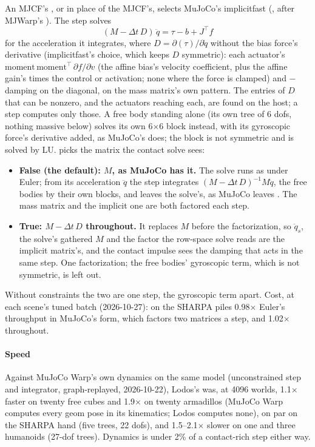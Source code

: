 An MJCF's , or  in place of the MJCF's, selects MuJoCo's implicitfast (, after MJWarp's ). The step solves
\begin{equation}\label{eq:implicitfast}
(M - \Delta t\,D)\,\ddot q = \tau - b + J^\top f
\end{equation}
for the acceleration it integrates, where $D = \partial(\tau)/\partial \dot q$ without the bias force's derivative (implicitfast's choice, which keeps $D$ symmetric): each actuator's $\mathrm{moment}\,\mathrm{moment}^\top\, \partial f/\partial v$ (the affine bias's velocity coefficient, plus the affine gain's times the control or activation; none where the force is clamped) and $-$damping on the diagonal, on the mass matrix's own pattern. The entries of $D$ that can be nonzero, and the actuators reaching each, are found on the host; a step computes only those. A free body standing alone (its own tree of 6 dofs, nothing massive below) solves its own 6$\times$6 block instead, with its gyroscopic force's derivative added, as MuJoCo's  does; the block is not symmetric and is solved by LU.  picks the matrix the contact solve sees:
\begin{itemize}
\item \textbf{False (the default): $M$, as MuJoCo has it.} The solve runs as under Euler; from its acceleration $\ddot q$ the step integrates $(M - \Delta t\,D)^{-1} M \ddot q$, the free bodies by their own blocks, and leaves  the solve's, as MuJoCo leaves . The mass matrix and the implicit one are both factored each step.
\item \textbf{True: $M - \Delta t\,D$ throughout.} It replaces $M$ before the factorization, so $\ddot q_s$, the solve's gathered $M$ and the factor the row-space solve reads are the implicit matrix's, and the contact impulse sees the damping that acts in the same step. One factorization; the free bodies' gyroscopic term, which is not symmetric, is left out.
\end{itemize}
Without constraints the two are one step, the gyroscopic term apart. Cost, at each scene's tuned batch (2026-10-27): on the SHARPA piles 0.98$\times$ Euler's throughput in MuJoCo's form, which factors two matrices a step, and 1.02$\times$ throughout.

\paragraph{Speed} Against MuJoCo Warp's own dynamics on the same model (unconstrained step and integrator, graph-replayed, 2026-10-22), Lodos's was, at 4096 worlds, 1.1$\times$ faster on twenty free cubes and 1.9$\times$ on twenty armadillos (MuJoCo Warp computes every geom pose in its kinematics; Lodos computes none), on par on the SHARPA hand (five trees, 22 dofs), and 1.5--2.1$\times$ slower on one and three humanoids (27-dof trees). Dynamics is under 2\% of a contact-rich step either way.

